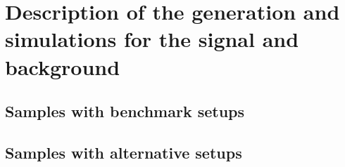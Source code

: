 \section{Description of the generation and simulations for the signal and background}
\label{sec:samples}

\subsection{Samples with benchmark setups}
\subsection{Samples with alternative setups}
